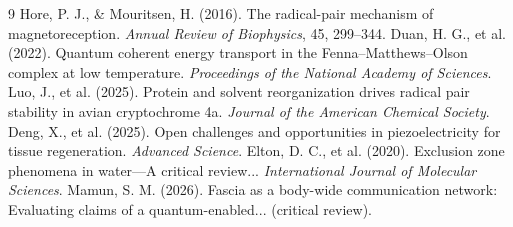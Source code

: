 \documentclass{article}
\begin{document}
\begin{thebibliography}{9}
 Hore, P. J., \& Mouritsen, H. (2016). The radical-pair mechanism of magnetoreception. \textit{Annual Review of Biophysics}, 45, 299--344.
 Duan, H. G., et al. (2022). Quantum coherent energy transport in the Fenna--Matthews--Olson complex at low temperature. \textit{Proceedings of the National Academy of Sciences}.
 Luo, J., et al. (2025). Protein and solvent reorganization drives radical pair stability in avian cryptochrome 4a. \textit{Journal of the American Chemical Society}.
 Deng, X., et al. (2025). Open challenges and opportunities in piezoelectricity for tissue regeneration. \textit{Advanced Science}.
 Elton, D. C., et al. (2020). Exclusion zone phenomena in water—A critical review... \textit{International Journal of Molecular Sciences}.
 Mamun, S. M. (2026). Fascia as a body-wide communication network: Evaluating claims of a quantum-enabled... (critical review).
\end{thebibliography}
\end{document}
